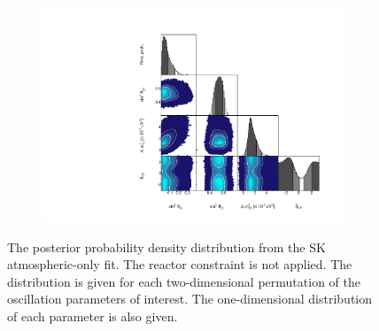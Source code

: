 
\begin{figure}[h]
  \begin{subfigure}[t]{\textwidth}
    \includegraphics[width=\textwidth, trim={0mm 0mm 0mm 0mm}, clip,page=1]{Figures/OA/SKOnlyFit/Contours_1D_woRC_UnSmeared_CredibleInterval_TrianglePlot.pdf}
  \end{subfigure}
  \caption{The posterior probability density distribution from the SK atmospheric-only fit. The reactor constraint is not applied. The distribution is given for each two-dimensional permutation of the oscillation parameters of interest. The one-dimensional distribution of each parameter is also given.}
  \label{fig:OscillationAnalysis_SKOnly_TrianglePlot}
\end{figure}

